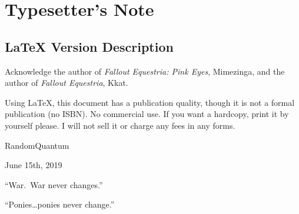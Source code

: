 \chapter{Typesetter's Note}

\section*{\LaTeX{} Version Description}

Acknowledge the author of \emph{Fallout Equestria: Pink Eyes}, Mimezinga, and the author of \emph{Fallout Equestria}, Kkat.

Using \LaTeX{}, this document has a publication quality, though it is not a formal publication (no ISBN). No commercial use. If you want a hardcopy, print it by yourself please. I will not sell it or charge any fees in any forms.

\begin{flushright}
RandomQuantum

June 15th, 2019
\end{flushright}

\clearpage

\begin{motto}
``War. War never changes.''

\medskip

``Ponies\dots ponies never change.''
\end{motto}


